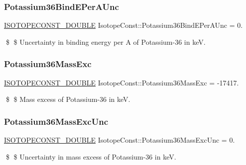 \subsubsection{\texorpdfstring{Potassium36\+Bind\+E\+Per\+A\+Unc}{Potassium36BindEPerAUnc}}
{\footnotesize\ttfamily \mbox{\hyperlink{group___isotope_const-_macros_ga8f45a7272ce02c0b4c65c44636ed719a}{I\+S\+O\+T\+O\+P\+E\+C\+O\+N\+S\+T\+\_\+\+D\+O\+U\+B\+LE}} Isotope\+Const\+::\+Potassium36\+Bind\+E\+Per\+A\+Unc = 0.}

\$ \$ Uncertainty in binding energy per A of Potassium-\/36 in keV. \mbox{\label{group___isotope_const-_potassium-_k36_ga954f2d5c719336f7be4b4502c02e3fef}} 
\subsubsection{\texorpdfstring{Potassium36\+Mass\+Exc}{Potassium36MassExc}}
{\footnotesize\ttfamily \mbox{\hyperlink{group___isotope_const-_macros_ga8f45a7272ce02c0b4c65c44636ed719a}{I\+S\+O\+T\+O\+P\+E\+C\+O\+N\+S\+T\+\_\+\+D\+O\+U\+B\+LE}} Isotope\+Const\+::\+Potassium36\+Mass\+Exc = -\/17417.}

\$ \$ Mass excess of Potassium-\/36 in keV. \mbox{\label{group___isotope_const-_potassium-_k36_ga44c71b3b49248096b218b7c8b687b4e9}} 
\subsubsection{\texorpdfstring{Potassium36\+Mass\+Exc\+Unc}{Potassium36MassExcUnc}}
{\footnotesize\ttfamily \mbox{\hyperlink{group___isotope_const-_macros_ga8f45a7272ce02c0b4c65c44636ed719a}{I\+S\+O\+T\+O\+P\+E\+C\+O\+N\+S\+T\+\_\+\+D\+O\+U\+B\+LE}} Isotope\+Const\+::\+Potassium36\+Mass\+Exc\+Unc = 0.}

\$ \$ Uncertainty in mass excess of Potassium-\/36 in keV. \mbox{\label{group___isotope_const-_potassium-_k36_ga4fc174c3c91608b0d5202606ac3df04b}} 

